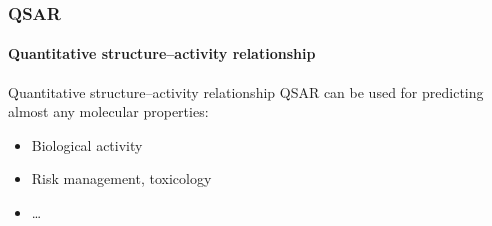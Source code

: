 \documentclass[aspectratio=169]{beamer}
\begin{document}
    \begin{frame}
        \frametitle{QSAR}
        \framesubtitle{Quantitative structure–activity relationship}

        \begin{block}{Quantitative structure–activity relationship}
            QSAR can be used for predicting almost any molecular properties:
            \begin{itemize}
                \item Biological activity
                \item Risk management, toxicology
                \item \ldots
            \end{itemize}
        \end{block}

    \end{frame}
\end{document}
